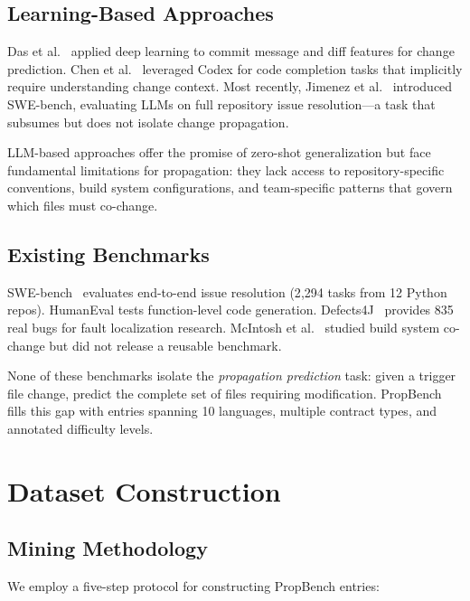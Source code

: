 \documentclass[sigconf,nonacm]{acmart}
\begin{document}
\subsection{Learning-Based Approaches}

Das et al.~\cite{das2016} applied deep learning to commit message and diff features for change prediction. Chen et al.~\cite{chen2021} leveraged Codex for code completion tasks that implicitly require understanding change context. Most recently, Jimenez et al.~\cite{jimenez2023} introduced SWE-bench, evaluating LLMs on full repository issue resolution---a task that subsumes but does not isolate change propagation.

LLM-based approaches offer the promise of zero-shot generalization but face fundamental limitations for propagation: they lack access to repository-specific conventions, build system configurations, and team-specific patterns that govern which files must co-change.

\subsection{Existing Benchmarks}

SWE-bench~\cite{jimenez2023} evaluates end-to-end issue resolution (2{,}294 tasks from 12 Python repos). HumanEval tests function-level code generation. Defects4J~\cite{just2014} provides 835 real bugs for fault localization research. McIntosh et al.~\cite{mcintosh2014} studied build system co-change but did not release a reusable benchmark.

None of these benchmarks isolate the \emph{propagation prediction} task: given a trigger file change, predict the complete set of files requiring modification. PropBench fills this gap with entries spanning 10 languages, multiple contract types, and annotated difficulty levels.

\section{Dataset Construction}
\label{sec:dataset}

\subsection{Mining Methodology}

We employ a five-step protocol for constructing PropBench entries:
\end{document}
